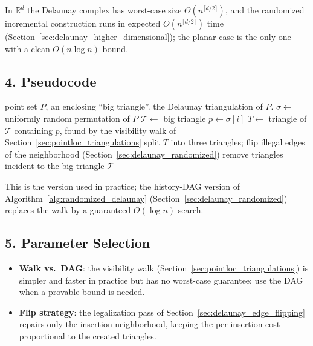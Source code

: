 In $\mathbb{R}^d$ the Delaunay complex has worst-case size
$\Theta(n^{\lceil d/2 \rceil})$, and the randomized incremental construction
runs in expected $O(n^{\lceil d/2 \rceil})$ time
(Section~\ref{sec:delaunay_higher_dimensional}); the planar case is the only
one with a clean $O(n \log n)$ bound.

\subsection{4. Pseudocode}

\begin{algorithm}[htbp]
\caption{Randomized Incremental Delaunay (Walk Variant)}
\label{alg:rand_delaunay_insert}
\begin{algorithmic}[1]
\Require point set $P$, an enclosing ``big triangle''.
\Ensure the Delaunay triangulation of $P$.
  \State $\sigma \gets$ uniformly random permutation of $P$
  \State $\mathcal{T} \gets$ big triangle
    \State $p \gets \sigma[i]$
    \State $T \gets$ triangle of $\mathcal{T}$ containing $p$, found by the visibility walk of Section~\ref{sec:pointloc_triangulations}
    \State split $T$ into three triangles; flip illegal edges of the neighborhood (Section~\ref{sec:delaunay_randomized})
  \EndFor
  \State remove triangles incident to the big triangle
  \State \Return $\mathcal{T}$
\EndFunction
\end{algorithmic}
\end{algorithm}

This is the version used in practice; the history-DAG version of
Algorithm~\ref{alg:randomized_delaunay} (Section~\ref{sec:delaunay_randomized})
replaces the walk by a guaranteed $O(\log n)$ search.

\subsection{5. Parameter Selection}

\begin{itemize}
\item \textbf{Walk vs.\ DAG}: the visibility walk
  (Section~\ref{sec:pointloc_triangulations}) is simpler and faster in practice
  but has no worst-case guarantee; use the DAG when a provable bound is needed.
\item \textbf{Flip strategy}: the legalization pass of
  Section~\ref{sec:delaunay_edge_flipping} repairs only the insertion
  neighborhood, keeping the per-insertion cost proportional to the created
  triangles.
\end{itemize}

